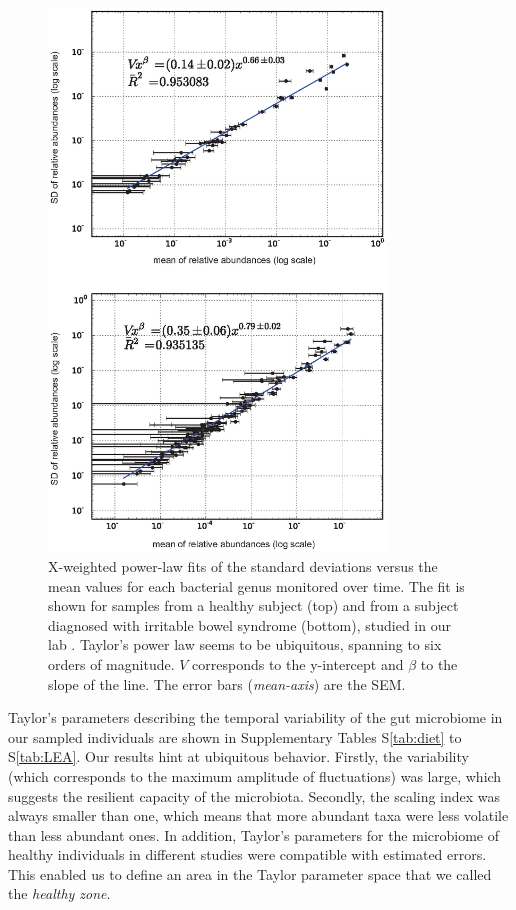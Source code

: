 \begin{figure}
	\centering
	\vspace*{-15mm} %
	\includegraphics[width=0.8\textwidth]{figs/Fig1.eps}
	\caption{X-weighted power-law fits of the standard deviations versus the mean values for each bacterial genus monitored over time. The fit is shown for samples from a healthy subject (top) and from a subject diagnosed with irritable bowel syndrome (bottom), studied in our lab \cite{IBS}. Taylor's power law seems to be ubiquitous, spanning to six orders of magnitude. $V$ corresponds to the y-intercept and $\beta$ to the slope of the line. The error bars (\emph{mean-axis}) are the SEM.}
	\label{fig:main1}
\end{figure}

Taylor's parameters describing the temporal variability of the gut microbiome in our sampled individuals are shown in Supplementary Tables S\ref{tab:diet} to S\ref{tab:LEA}. Our results hint at ubiquitous behavior. Firstly, the variability (which corresponds to the maximum amplitude of fluctuations) was large, which suggests the resilient capacity of the microbiota. Secondly, the scaling index was always smaller than one, which means that more abundant taxa were less volatile than less abundant ones. In addition, Taylor's parameters for the microbiome of healthy individuals in different studies were compatible with estimated errors. This enabled us to define an area in the Taylor parameter space that we called the \emph{healthy zone}. 

